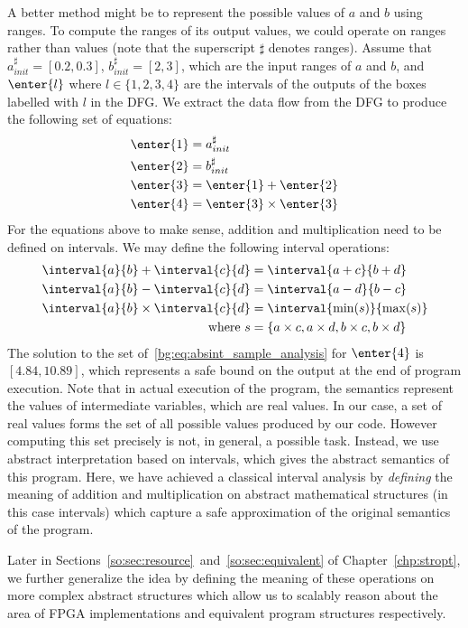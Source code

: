A better method might be to represent the possible values of $a$ and $b$ using
ranges. To compute the ranges of its output values, we could operate on ranges
rather than values (note that the superscript $\sharp$ denotes ranges). Assume
that $a^\sharp_{init} = [0.2, 0.3]$, $b^\sharp_{init} = [2, 3]$, which are the
input ranges of $a$ and $b$, and $\enter{l}$ where $l \in \{1, 2, 3, 4\}$ are
the intervals of the outputs of the boxes labelled with $l$ in the DFG\@. We
extract the data flow from the DFG to produce the following set of equations:
\begin{equation}
    \begin{aligned}
        \enter{1} &= a^\sharp_{init} \\
        \enter{2} &= b^\sharp_{init} \\
        \enter{3} &= \enter{1} + \enter{2} \\
        \enter{4} &= \enter{3} \times \enter{3}
    \end{aligned}
    \label{bg:eq:absint_sample_analysis}
\end{equation}
For the equations above to make sense, addition and multiplication need to be
defined on intervals. We may define the following interval operations:
\begin{equation}
    \begin{aligned}
        \interval{a}{b} + \interval{c}{d} &= \interval{a + c}{b + d} \\
        \interval{a}{b} - \interval{c}{d} &=  \interval{a - d}{b - c} \\
        \interval{a}{b} \times \interval{c}{d} &=
            \interval{\min(s)}{\max(s)} \\
        \text{where~} s &= \{ a \times c, a \times d, b \times c, b \times d \}
    \end{aligned}
    \label{bg:eq:interval_operations}
\end{equation}
The solution to the set of~\eqref{bg:eq:absint_sample_analysis} for $\enter{4}$
is $[4.84, 10.89]$, which represents a safe bound on the output at the end
of program execution. Note that in actual execution of the program, the
semantics represent the values of intermediate variables, which are real
values. In our case, a set of real values forms the set of all possible
values produced by our code. However computing this set precisely is not,
in general, a possible task. Instead, we use abstract interpretation based
on intervals, which gives the abstract semantics of this program. Here, we
have achieved a classical interval analysis by \emph{defining} the meaning of
addition and multiplication on abstract mathematical structures (in this case
intervals) which capture a safe approximation of the original semantics of the
program.

Later in Sections~\ref{so:sec:resource}~and~\ref{so:sec:equivalent} of
Chapter~\ref{chp:stropt}, we further generalize the idea by defining the
meaning of these operations on more complex abstract structures which allow
us to scalably reason about the area of FPGA implementations and equivalent
program structures respectively.
